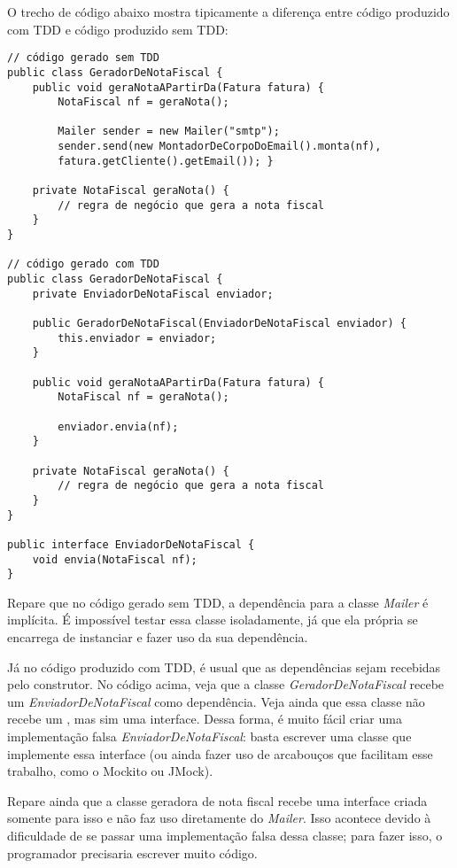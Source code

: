 O trecho de código abaixo mostra tipicamente a diferença entre código produzido
com TDD e código produzido sem TDD:

\begin{lstlisting}[frame=trbl]
// código gerado sem TDD
public class GeradorDeNotaFiscal {
	public void geraNotaAPartirDa(Fatura fatura) {
		NotaFiscal nf = geraNota(); 
		
		Mailer sender = new Mailer("smtp");
		sender.send(new MontadorDeCorpoDoEmail().monta(nf),
		fatura.getCliente().getEmail()); }
	
	private NotaFiscal geraNota() {
		// regra de negócio que gera a nota fiscal
	}
}

// código gerado com TDD
public class GeradorDeNotaFiscal {
	private EnviadorDeNotaFiscal enviador;
	
	public GeradorDeNotaFiscal(EnviadorDeNotaFiscal enviador) {
		this.enviador = enviador;
	}
	
	public void geraNotaAPartirDa(Fatura fatura) {
		NotaFiscal nf = geraNota(); 
		
		enviador.envia(nf);
	}
	
	private NotaFiscal geraNota() {
		// regra de negócio que gera a nota fiscal
	}
}

public interface EnviadorDeNotaFiscal {
	void envia(NotaFiscal nf);
}
\end{lstlisting}

Repare que no código gerado sem TDD, a dependência para a classe \textit{Mailer}
é implícita. É impossível testar essa classe isoladamente, já que ela própria se
encarrega de instanciar e fazer uso da sua dependência. 

Já no código produzido com TDD, é usual que as dependências sejam recebidas pelo
construtor. No código acima, veja que a classe \textit{GeradorDeNotaFiscal}
recebe um \textit{EnviadorDeNotaFiscal} como dependência. Veja ainda que essa
classe não recebe um , mas sim uma interface. Dessa forma, é muito
fácil criar uma implementação falsa \textit{EnviadorDeNotaFiscal}: basta
escrever uma classe que implemente essa interface (ou ainda fazer uso de
arcabouços que facilitam esse trabalho, como o Mockito ou JMock).

Repare ainda que a classe geradora de nota fiscal recebe uma interface criada
somente para isso e não faz uso diretamente do \textit{Mailer}. Isso acontece
devido à dificuldade de se passar uma implementação falsa dessa classe; para
fazer isso, o programador precisaria escrever muito código.

